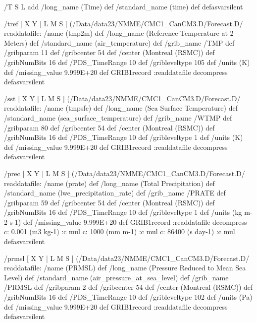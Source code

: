 \begin{ingrid}
/T { S L add
/long_name (Time) def
/standard_name (time) def } defasvarsilent

/tref {
[ X Y | L M S ] (/Data/data23/NMME/CMC1_CanCM3.D/Forecast.D/%
readdatafile: 
/name (tmp2m) def
/long_name (Reference Temperature at 2 Meters) def
/standard_name (air_temperature) def
/grib_name /TMP def
/gribparam 11 def
/gribcenter 54 def
/center (Montreal (RSMC)) def
/gribNumBits 16 def
/PDS_TimeRange 10 def
/gribleveltype 105 def
/units (K) def
/missing_value 9.999E+20 def
GRIB1record
:readdatafile decompress
} defasvarsilent

/sst {
[ X Y | L M S ] (/Data/data23/NMME/CMC1_CanCM3.D/Forecast.D/%
readdatafile: 
/name (tmpsfc) def
/long_name (Sea Surface Temperature) def
/standard_name (sea_surface_temperature) def
/grib_name /WTMP def
/gribparam 80 def
/gribcenter 54 def
/center (Montreal (RSMC)) def
/gribNumBits 16 def
/PDS_TimeRange 10 def
/gribleveltype 1 def
/units (K) def
/missing_value 9.999E+20 def
GRIB1record
:readdatafile decompress
} defasvarsilent

/prec {
[ X Y | L M S ] (/Data/data23/NMME/CMC1_CanCM3.D/Forecast.D/%
readdatafile: 
/name (prate) def
/long_name (Total Precipitation) def
/standard_name (lwe_precipitation_rate) def
/grib_name /PRATE def
/gribparam 59 def
/gribcenter 54 def
/center (Montreal (RSMC)) def
/gribNumBits 16 def
/PDS_TimeRange 10 def
/gribleveltype 1 def
/units (kg m-2 s-1) def
/missing_value 9.999E+20 def
GRIB1record
:readdatafile decompress
  c:
   0.001 (m3 kg-1) :c
   mul
  c:
   1000 (mm m-1) :c
   mul
  c:
   86400 (s day-1) :c
   mul
} defasvarsilent

/prmsl {
[ X Y | L M S ] (/Data/data23/NMME/CMC1_CanCM3.D/Forecast.D/%
readdatafile: 
/name (PRMSL) def
/long_name (Pressure Reduced to Mean Sea Level) def
/standard_name (air_pressure_at_sea_level) def
/grib_name /PRMSL def
/gribparam 2 def
/gribcenter 54 def
/center (Montreal (RSMC)) def
/gribNumBits 16 def
/PDS_TimeRange 10 def
/gribleveltype 102 def
/units (Pa) def
/missing_value 9.999E+20 def
GRIB1record
:readdatafile decompress
} defasvarsilent


\end{ingrid}
